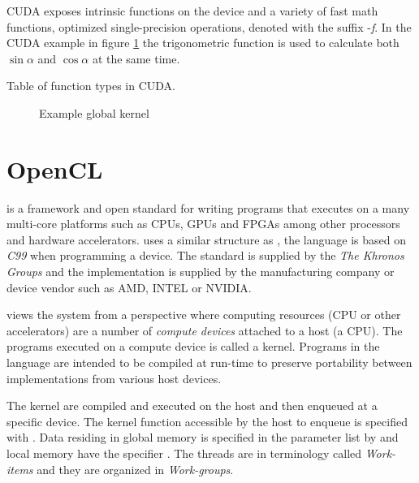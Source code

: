 CUDA exposes intrinsic functions on the device and a variety of fast math functions, optimized single-precision operations, denoted with the suffix -\emph{f}. In the CUDA example in figure \ref{lst:sample:global:cu} the trigonometric function  is used to calculate both $\sin{\alpha}$ and $\cos{\alpha}$ at the same time.

\begin{table}
	\centering
	
	\caption{Table of function types in CUDA.}
	\label{tab:cuda:func-types}
\end{table}

\begin{figure}
	\centering
	\fbox{}
	\caption{Example {\CU} global kernel}
	\label{lst:sample:global:cu}	
\end{figure}

\section{OpenCL}

{\OCL} is a framework and open standard for writing programs that executes on a many multi-core platforms such as CPUs, GPUs and FPGAs among other processors and hardware accelerators. {\OCL} uses a similar structure as {\CU}, the language is based on \emph{C99} when programming a device. The standard is supplied by the \emph{The Khronos Groups} and the implementation is supplied by the manufacturing company or device vendor such as AMD, INTEL or NVIDIA.

{\OCL} views the system from a perspective where computing resources (CPU or other accelerators) are a number of \emph{compute devices} attached to a host (a CPU). The programs executed on a compute device is called a kernel. Programs in the {\OCL} language are intended to be compiled at run-time to preserve portability between implementations from various host devices.

The {\OCL} kernel are compiled and executed on the host and then enqueued at a specific device. The kernel function accessible by the host to enqueue is specified with . Data residing in global memory is specified in the parameter list by  and local memory have the specifier . The {\CU} threads are in {\OCL} terminology called \emph{Work-items} and they are organized in \emph{Work-groups}.

